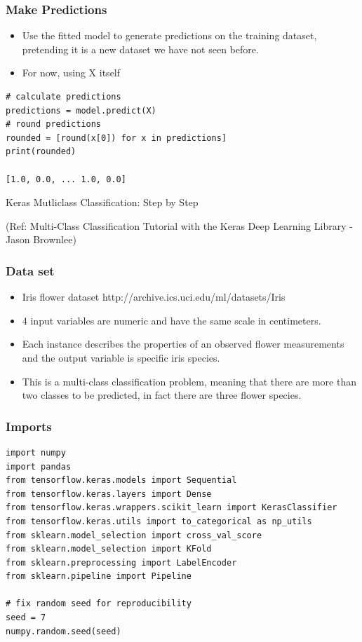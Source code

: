 \begin{frame}[fragile] \frametitle{Make Predictions}
 \begin{itemize}
\item Use the fitted model to generate predictions on the training dataset, pretending it is a new dataset we have not seen before.
\item For now, using X itself
\end{itemize}
\begin{lstlisting}
# calculate predictions
predictions = model.predict(X)
# round predictions
rounded = [round(x[0]) for x in predictions]
print(rounded)

[1.0, 0.0, ... 1.0, 0.0]
\end{lstlisting}
\end{frame}


\begin{frame}
  \begin{center}
    {\Large Keras Mutliclass Classification: Step by Step}
    
    \tiny{(Ref:  Multi-Class Classification Tutorial with the Keras Deep Learning Library - Jason Brownlee)}
  \end{center}
\end{frame}


\begin{frame}[fragile] \frametitle{Data set}
 \begin{itemize}
 \item  Iris flower dataset http://archive.ics.uci.edu/ml/datasets/Iris
 \item  4 input variables are numeric and have the same scale in centimeters. 
 \item Each instance describes the properties of an observed flower measurements and the output variable is specific iris species.
 \item This is a multi-class classification problem, meaning that there are more than two classes to be predicted, in fact there are three flower species.
\end{itemize}
\end{frame}

\begin{frame}[fragile] \frametitle{Imports}
\begin{lstlisting}
import numpy
import pandas
from tensorflow.keras.models import Sequential
from tensorflow.keras.layers import Dense
from tensorflow.keras.wrappers.scikit_learn import KerasClassifier
from tensorflow.keras.utils import to_categorical as np_utils
from sklearn.model_selection import cross_val_score
from sklearn.model_selection import KFold
from sklearn.preprocessing import LabelEncoder
from sklearn.pipeline import Pipeline

# fix random seed for reproducibility
seed = 7
numpy.random.seed(seed)
\end{lstlisting}
\end{frame}

